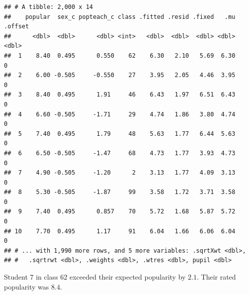 \documentclass[]{article}
\newenvironment{Shaded}{\begin{snugshade}}{\end{snugshade}}
\newcommand{\KeywordTok}[1]{\textcolor[rgb]{0.13,0.29,0.53}{\textbf{#1}}}
\newcommand{\DataTypeTok}[1]{\textcolor[rgb]{0.13,0.29,0.53}{#1}}
\newcommand{\DecValTok}[1]{\textcolor[rgb]{0.00,0.00,0.81}{#1}}
\newcommand{\StringTok}[1]{\textcolor[rgb]{0.31,0.60,0.02}{#1}}
\newcommand{\OperatorTok}[1]{\textcolor[rgb]{0.81,0.36,0.00}{\textbf{#1}}}
\newcommand{\NormalTok}[1]{#1}
\begin{document}
\begin{Shaded}
\end{Shaded}

\begin{verbatim}
## # A tibble: 2,000 x 14
##    popular  sex_c popteach_c class .fitted .resid .fixed   .mu .offset
##      <dbl>  <dbl>      <dbl> <int>   <dbl>  <dbl>  <dbl> <dbl>   <dbl>
##  1    8.40  0.495      0.550    62    6.30   2.10   5.69  6.30       0
##  2    6.00 -0.505     -0.550    27    3.95   2.05   4.46  3.95       0
##  3    8.40  0.495      1.91     46    6.43   1.97   6.51  6.43       0
##  4    6.60 -0.505     -1.71     29    4.74   1.86   3.80  4.74       0
##  5    7.40  0.495      1.79     48    5.63   1.77   6.44  5.63       0
##  6    6.50 -0.505     -1.47     68    4.73   1.77   3.93  4.73       0
##  7    4.90 -0.505     -1.20      2    3.13   1.77   4.09  3.13       0
##  8    5.30 -0.505     -1.87     99    3.58   1.72   3.71  3.58       0
##  9    7.40  0.495      0.857    70    5.72   1.68   5.87  5.72       0
## 10    7.70  0.495      1.17     91    6.04   1.66   6.06  6.04       0
## # ... with 1,990 more rows, and 5 more variables: .sqrtXwt <dbl>,
## #   .sqrtrwt <dbl>, .weights <dbl>, .wtres <dbl>, pupil <dbl>
\end{verbatim}

\begin{Shaded}
\end{Shaded}

Student \(7\) in class \(62\) exceeded their expected popularity by
\(2.1\). Their rated popularity was \(8.4\).
\end{document}
